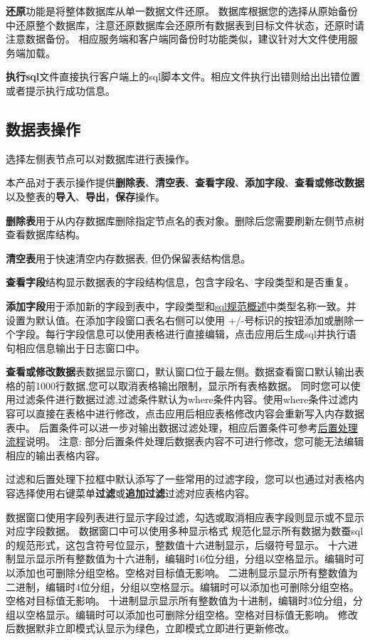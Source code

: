 \textbf{还原}功能是将整体数据库从单一数据文件还原。
数据库根据您的选择从原始备份中还原整个数据库，注意还原数据库会还原所有数据表到目标文件状态，还原时请注意数据备份。
相应服务端和客户端同备份时功能类似，建议针对大文件使用服务端加载。

\textbf{执行sql}文件直接执行客户端上的sql脚本文件。相应文件执行出错则给出出错位置或者提示执行成功信息。

\subsection{数据表操作}
\bigskip

选择左侧表节点可以对数据库进行表操作。

本产品对于表示操作提供\textbf{删除表}、\textbf{清空表}、\textbf{查看字段}、\textbf{添加字段}、\textbf{查看或修改数据}以及整表的\textbf{导入}、\textbf{导出}，\textbf{保存}操作。

\textbf{删除表}用于从内存数据库删除指定节点名的表对象。删除后您需要刷新左侧节点树查看数据库结构。

\textbf{清空表}用于快速清空内存数据表, 但仍保留表结构信息。

\textbf{查看字段}结构显示数据表的字段结构信息，包含字段名、字段类型和是否重复。

\textbf{添加字段}用于添加新的字段到表中，字段类型和\href{http://www.shucantech.com/zh/sql/sql_ref_0.2.0.html#overview}{sql规范概述}中类型名称一致。并设置为默认值。在添加字段窗口表名右侧可以使用
+/-号标识的按钮添加或删除一个字段。每行字段信息可以使用表格进行直接编辑，点击应用后生成sql并执行语句相应信息输出于日志窗口中。

\textbf{查看或修改数据}表数据显示窗口，默认窗口位于最左侧。数据查看窗口默认输出表格的前1000行数据,您可以取消表格输出限制，显示所有表格数据。
同时您可以使用过滤条件进行数据过滤,过滤条件默认为where条件内容。使用where条件过滤内容可以直接在表格中进行修改，点击应用后相应表格修改内容会重新写入内存数据表中。
后置条件可以进一步对输出数据过滤处理，相应后置条件可参考\href{http://www.shucantech.com/zh/sql/sql_ref_0.2.0.html#process}{后置处理流程}说明。
{\color{orange}注意}: 部分后置条件处理后数据表内容不可进行修改，您可能无法编辑相应的输出表格内容。

过滤和后置处理下拉框中默认添写了一些常用的过滤字段，您可以也通过对表格内容选择使用右键菜单\textbf{过滤}或\textbf{追加过滤}过滤对应表格内容。

数据窗口使用字段列表进行显示字段过滤，勾选或取消相应表字段则显示或不显示对应字段数据。
数据窗口中可以使用多种显示格式
规范化显示所有数据为数蚕sql的规范形式，这包含符号位显示，整数值十六进制显示，后缀符号显示。
十六进制显示显示所有整数值为十六进制，编辑时16位分组，分组以空格显示。编辑时可以添加也可删除分组空格。空格对目标值无影响。
二进制显示显示所有整数值为二进制，编辑时4位分组，分组以空格显示。编辑时可以添加也可删除分组空格。空格对目标值无影响。
十进制显示显示所有整数值为十进制，编辑时3位分组，分组以空格显示。编辑时可以添加也可删除分组空格。空格对目标值无影响。
修改后数据默非立即模式认显示为绿色，立即模式立即进行更新修改。

